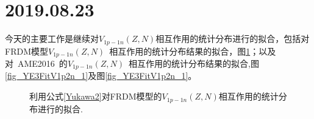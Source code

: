 \section{2019.08.23}
今天的主要工作是继续对$V_{1p-1n}(Z,N)$相互作用的统计分布进行的拟合，包括对FRDM模型$V_{1p-1n}(Z,N)$~相互作用的统计分布结果的拟合，图\ref{fig_YE3FRDMFit}；以及对~AME2016~的$V_{1p-1n}(Z,N)$~相互作用的统计分布结果的拟合,图\ref{fig_YE3FitV1p2n_1}及图\ref{fig_YE3FitV1p2n_1}。
\begin{figure}[H]
\centering
{}
\qquad
{}
\caption{利用公式\ref{Yukawa2}对FRDM模型的$V_{1p-1n}(Z,N)$相互作用的统计分布进行的拟合.\label{fig_YE3FRDMFit}}
\end{figure}
